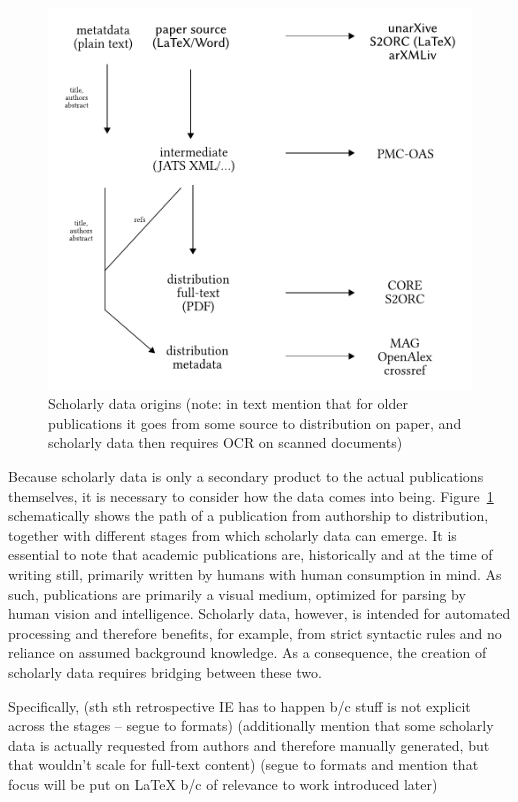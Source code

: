 \begin{figure}[bt]
  \centering
  \includegraphics[width=0.7\linewidth]{figures/foundations/scholarly_data_lifecycle_dummy}
  \caption[Scholarly data origins]{Scholarly data origins (note: in text mention that for older publications it goes from some source to distribution on paper, and scholarly data then requires OCR on scanned documents)}
  \label{fig:foundations-datalifecycle}
\end{figure}

Because scholarly data is only a secondary product to the actual publications themselves, it is necessary to consider how the data comes into being. Figure~\ref{fig:foundations-datalifecycle} schematically shows the path of a publication from authorship to distribution, together with different stages from which scholarly data can emerge. It is essential to note that academic publications are, historically and at the time of writing still, primarily written by humans with human consumption in mind. As such, publications are primarily a visual medium, optimized for parsing by human vision and intelligence. Scholarly data, however, is intended for automated processing and therefore benefits, for example, from strict syntactic rules and no reliance on assumed background knowledge. As a consequence, the creation of scholarly data requires bridging between these two.

Specifically, (sth sth retrospective IE has to happen b/c stuff is not explicit across the stages -- segue to formats)
(additionally mention that some scholarly data is actually requested from authors and therefore manually generated, but that wouldn't scale for full-text content)
(segue to formats and mention that focus will be put on LaTeX b/c of relevance to work introduced later)

